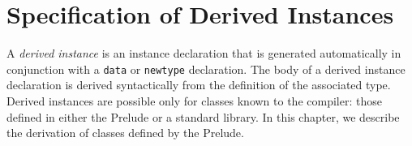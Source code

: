 %
%


\chapter{Specification of Derived Instances}
\label{derived-appendix}

A {\em derived instance} is an instance declaration that is generated
automatically in conjunction with a \mbox{\tt data} or \mbox{\tt newtype} declaration.
The body of a derived instance declaration is derived syntactically from
the definition of the associated type.  Derived instances are
possible only for classes known to the compiler: those defined in
either the Prelude or a standard library.  In this chapter, we
describe the derivation of classes defined by the Prelude.

